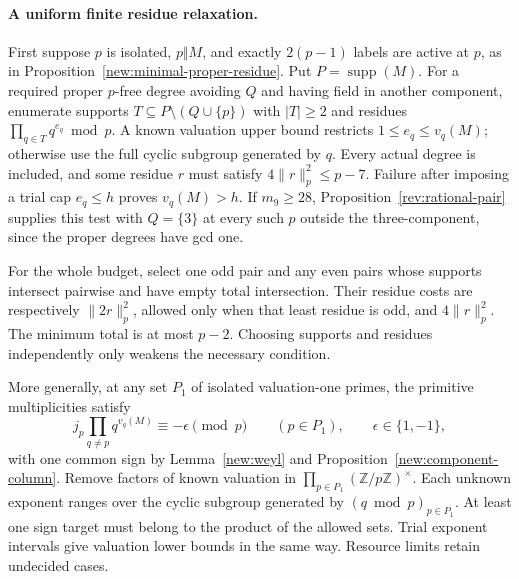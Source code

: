 \documentclass[11pt]{amsart}
\numberwithin{equation}{section}
\theoremstyle{definition}
\theoremstyle{plain}
\begin{document}
\paragraph{A uniform finite residue relaxation.}
First suppose $p$ is isolated, $p\Vert M$, and exactly $2(p-1)$
labels are active at $p$, as in
Proposition~\ref{new:minimal-proper-residue}. Put $P=\operatorname{supp}(M)$.
For a required proper $p$-free degree avoiding $Q$ and having field
in another component, enumerate supports
$T\subseteq P\setminus(Q\cup\{p\})$ with $|T|\ge2$ and residues
$\prod_{q\in T}q^{e_q}\bmod p$. A known valuation upper bound
restricts $1\le e_q\le v_q(M)$; otherwise use the full cyclic
subgroup generated by $q$. Every actual degree is included, and
some residue $r$ must satisfy $4\|r\|_p^2\le p-7$.
Failure after imposing a trial cap $e_q\le h$ proves $v_q(M)>h$.
If $m_9\ge28$, Proposition~\ref{rev:rational-pair} supplies this test
with $Q=\{3\}$ at every such $p$ outside the three-component,
since the proper degrees have gcd one.

For the whole budget, select one odd pair and any even pairs whose
supports intersect pairwise and have empty total intersection.
Their residue costs are respectively $\|2r\|_p^2$, allowed only
when that least residue is odd, and $4\|r\|_p^2$.
The minimum total is at most $p-2$. Choosing supports and residues
independently only weakens the necessary condition.

More generally, at any set $P_1$ of isolated valuation-one primes,
the primitive multiplicities satisfy
\[
 j_p\prod_{q\ne p}q^{v_q(M)}\equiv-\epsilon\pmod p
 \qquad(p\in P_1),\qquad \epsilon\in\{1,-1\},
\]
with one common sign by Lemma~\ref{new:weyl} and
Proposition~\ref{new:component-column}. Remove factors of known
valuation in $\prod_{p\in P_1}(\mathbb Z/p\mathbb Z)^\times$.
Each unknown exponent ranges over the cyclic subgroup generated
by $(q\bmod p)_{p\in P_1}$. At least one sign target must belong
to the product of the allowed sets. Trial exponent intervals give
valuation lower bounds in the same way. Resource limits retain
undecided cases.
\end{document}
